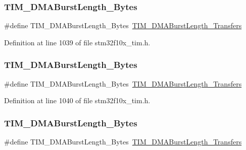 \subsubsection{\texorpdfstring{T\+I\+M\+\_\+\+D\+M\+A\+Burst\+Length\+\_\+Bytes}{TIM\_DMABurstLength\_14Bytes}}
{\footnotesize\ttfamily \#define T\+I\+M\+\_\+\+D\+M\+A\+Burst\+Length\+\_\+Bytes~\hyperlink{group___t_i_m___d_m_a___burst___length_gab1a097ca7404e518839df99795443fb0}{T\+I\+M\+\_\+\+D\+M\+A\+Burst\+Length\+\_\+Transfers}}



Definition at line 1039 of file stm32f10x\+\_\+tim.\+h.

\mbox{\label{group___t_i_m___legacy_ga3ca90d9fa3c80590175ba42baac57098}} 
\subsubsection{\texorpdfstring{T\+I\+M\+\_\+\+D\+M\+A\+Burst\+Length\+\_\+Bytes}{TIM\_DMABurstLength\_15Bytes}}
{\footnotesize\ttfamily \#define T\+I\+M\+\_\+\+D\+M\+A\+Burst\+Length\+\_\+Bytes~\hyperlink{group___t_i_m___d_m_a___burst___length_gad13373f5fd246557a4fc487dc43c37ec}{T\+I\+M\+\_\+\+D\+M\+A\+Burst\+Length\+\_\+Transfers}}



Definition at line 1040 of file stm32f10x\+\_\+tim.\+h.

\mbox{\label{group___t_i_m___legacy_ga672117a7dafcd778fe8e86db423b07e9}} 
\subsubsection{\texorpdfstring{T\+I\+M\+\_\+\+D\+M\+A\+Burst\+Length\+\_\+Bytes}{TIM\_DMABurstLength\_16Bytes}}
{\footnotesize\ttfamily \#define T\+I\+M\+\_\+\+D\+M\+A\+Burst\+Length\+\_\+Bytes~\hyperlink{group___t_i_m___d_m_a___burst___length_gafb644e6033f7b46c602b02754b69fde0}{T\+I\+M\+\_\+\+D\+M\+A\+Burst\+Length\+\_\+Transfers}}




